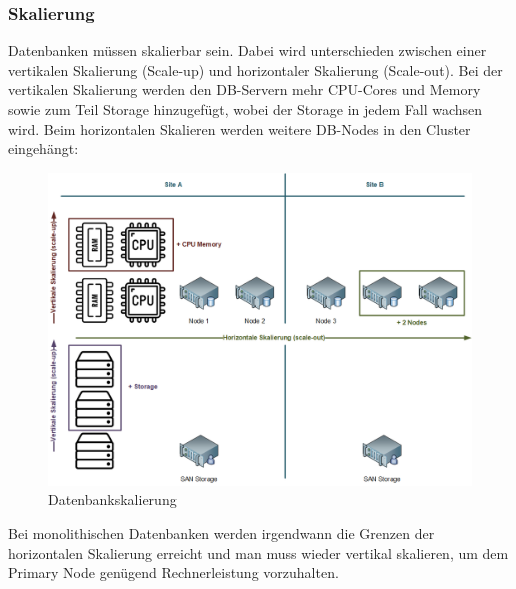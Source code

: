 
\clearpage
\subsubsection{Skalierung}
\begin{flushleft}
    Datenbanken müssen skalierbar sein.
    Dabei wird unterschieden zwischen einer vertikalen Skalierung (Scale-up) und horizontaler Skalierung (Scale-out).
    Bei der vertikalen Skalierung werden den DB-Servern mehr CPU-Cores und Memory sowie zum Teil Storage hinzugefügt, wobei der Storage in jedem Fall wachsen wird.
    Beim horizontalen Skalieren werden weitere DB-Nodes in den Cluster eingehängt\cite{IZSGZLVT}:
    \begin{figure}[H]
        \centering
        \includegraphics[width=1\linewidth]{source/implementation/evaluation/excursus_architecture/Skalierung}
        \caption{Datenbankskalierung}
        \label{fig:Datenbankskalierung}
    \end{figure}

    Bei monolithischen Datenbanken werden irgendwann die Grenzen der horizontalen Skalierung erreicht und man muss wieder vertikal skalieren, um dem Primary Node genügend Rechnerleistung vorzuhalten.
\end{flushleft}